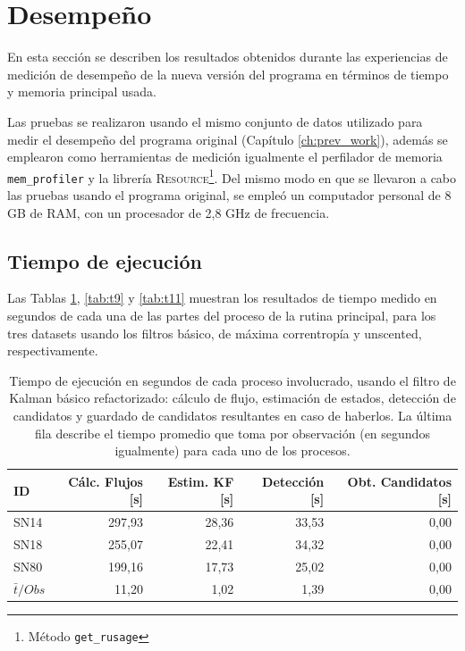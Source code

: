 \section{Desempe\~no}
En esta secci\'on se describen los resultados obtenidos durante las experiencias de medici\'on de desempe\~no de la nueva versi\'on del programa en t\'erminos de tiempo y memoria principal usada. 
\bigskip

Las pruebas se realizaron usando el mismo conjunto de datos utilizado para medir el desempe\~no del programa original 
(Cap\'itulo \ref{ch:prev_work}), adem\'as se emplearon como herramientas de medici\'on igualmente el perfilador de memoria \texttt{mem\_profiler} y la librer\'ia \textsc{Resource}\footnote{M\'etodo \texttt{get\_rusage}}. Del mismo modo en que se llevaron a cabo las pruebas usando el programa original, se emple\'o un computador personal de 8 GB de RAM, con un procesador de 2,8 GHz de frecuencia.  

\subsection{Tiempo de ejecuci\'on}
Las Tablas \ref{tab:t7}, \ref{tab:t9} y \ref{tab:t11} muestran los resultados de tiempo medido en segundos de cada una de las partes del proceso de la rutina principal, para los tres datasets usando los filtros b\'asico, de m\'axima correntrop\'ia y unscented, respectivamente. 

\begin{table}[h!]
\centering
\caption{Tiempo de ejecuci\'on en segundos de cada proceso involucrado, usando el filtro de Kalman b\'asico refactorizado: c\'alculo de flujo, estimaci\'on de estados, detecci\'on de candidatos y guardado de candidatos resultantes en caso de haberlos. La \'ultima fila describe el tiempo promedio que toma por observaci\'on (en segundos igualmente) para cada uno de los procesos. }
\begin{tabular}{|l|r|r|r|r|}
\hline
\textbf{ID} & \textbf{C\'alc. Flujos [s]} & \textbf{Estim. KF [s]} &  \textbf{Detecci\'on [s]}  & \textbf{Obt. Candidatos [s]}\\ \hline \hline
SN14        & 297,93            & 28,36        &  33,53 & 0,00 \\ \hline
SN18            & 255,07             & 22,41         & 34,32  & 0,00\\ \hline
SN80            & 199,16             & 17,73         &   25,02 & 0,00 \\ \hline \hline
$\bar{t}/Obs$ & 11,20 &  1,02 & 1,39 & 0,00\\\hline 
\end{tabular}
\label{tab:t7}
\end{table}

